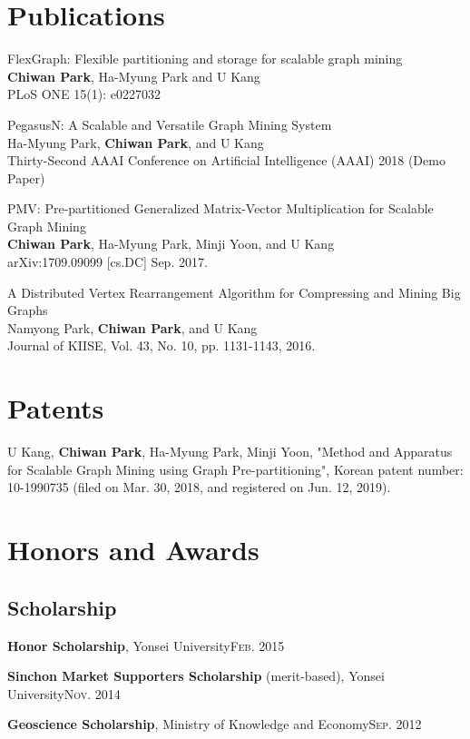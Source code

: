 \documentclass[11pt,a4paper]{article}
\renewenvironment{itemize}{
  \begin{list}{}{
    \setlength{\leftmargin}{1.5em}
    \setlength{\itemsep}{0.5em}
    \setlength{\parskip}{0pt}
    \setlength{\parsep}{0.25em}
  }
}{
  \end{list}
}
\begin{document}
\section*{Publications}
\begin{itemize}
  \item FlexGraph: Flexible partitioning and storage for scalable graph mining\\
  \textbf{Chiwan Park}, Ha-Myung Park and U Kang\\
  PLoS ONE 15(1): e0227032
  \item PegasusN: A Scalable and Versatile Graph Mining System\\
  Ha-Myung Park, \textbf{Chiwan Park}, and U Kang\\
  Thirty-Second AAAI Conference on Artificial Intelligence (AAAI) 2018 (Demo Paper)
  \item PMV: Pre-partitioned Generalized Matrix-Vector Multiplication for Scalable Graph Mining\\
  \textbf{Chiwan Park}, Ha-Myung Park, Minji Yoon, and U Kang\\
  arXiv:1709.09099 [cs.DC] Sep. 2017.
	\item A Distributed Vertex Rearrangement Algorithm for Compressing and Mining Big Graphs\\
	Namyong Park, \textbf{Chiwan Park}, and U Kang\\
	Journal of KIISE, Vol. 43, No. 10, pp. 1131-1143, 2016.
\end{itemize}

\section*{Patents}
\begin{itemize}
  \item U Kang, \textbf{Chiwan Park}, Ha-Myung Park, Minji Yoon, "Method and Apparatus for Scalable Graph Mining using Graph Pre-partitioning", Korean patent number: 10-1990735 (filed on Mar. 30, 2018, and registered on Jun. 12, 2019).
\end{itemize}

\section*{Honors and Awards}
\subsection*{Scholarship}
\begin{itemize}
	\setlength\itemsep{0.1em}
  \item \textbf{Honor Scholarship}, Yonsei University\hfill\textsc{Feb. 2015}
  \item \textbf{Sinchon Market Supporters Scholarship} (merit-based), Yonsei University\hfill\textsc{Nov. 2014}
  \item \textbf{Geoscience Scholarship}, Ministry of Knowledge and Economy\hfill\textsc{Sep. 2012}
\end{itemize}
\end{document}

